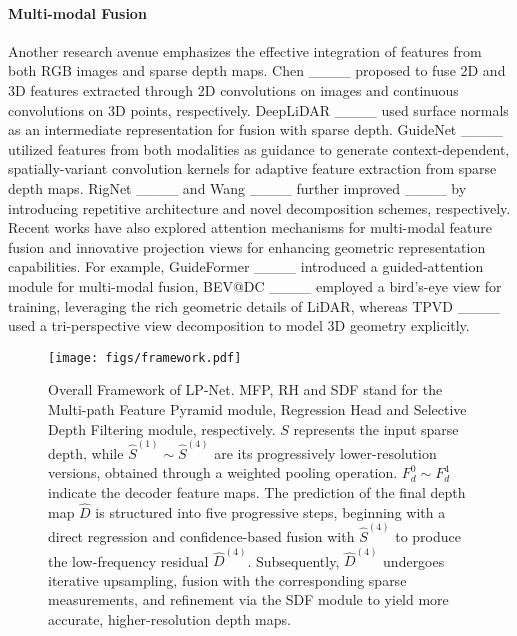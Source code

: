 \paragraph{Multi-modal Fusion}
Another research avenue emphasizes the effective integration of features from both RGB images and sparse depth maps. Chen \etal ____ proposed to fuse 2D and 3D features extracted through 2D convolutions on images and continuous convolutions on 3D points, respectively. DeepLiDAR ____ used surface normals as an intermediate representation for fusion with sparse depth. GuideNet ____ utilized features from both modalities as guidance to generate context-dependent, spatially-variant convolution kernels for adaptive feature extraction from sparse depth maps. RigNet ____ and Wang \etal ____ further improved ____ by introducing repetitive architecture and novel decomposition schemes, respectively. Recent works have also explored attention mechanisms for multi-modal feature fusion and innovative projection views for enhancing geometric representation capabilities. For example, GuideFormer ____ introduced a guided-attention module for multi-modal fusion, BEV@DC ____ employed a bird's-eye view for training, leveraging the rich geometric details of LiDAR, whereas TPVD ____ used a tri-perspective view decomposition to model 3D geometry explicitly.

\begin{figure*}
    \centering
    \texttt{[image: figs/framework.pdf]}
    \caption{Overall Framework of LP-Net. MFP, RH and SDF stand for the Multi-path Feature Pyramid module, Regression Head and Selective Depth Filtering module, respectively. $S$ represents the input sparse depth, while $\hat{S}^{(1)}\sim \hat{S}^{(4)}$ are its progressively lower-resolution versions, obtained through a weighted pooling operation. $F_{d}^{0}\sim F_{d}^{4}$ indicate the decoder feature maps. The prediction of the final depth map $\hat{D}$ is structured into five progressive steps, beginning with a direct regression and confidence-based fusion with $\hat{S}^{(4)}$ to produce the low-frequency residual $\hat{D}^{(4)}$. Subsequently, $\hat{D}^{(4)}$ undergoes iterative upsampling, fusion with the corresponding sparse measurements, and refinement via the SDF module to yield more accurate, higher-resolution depth maps.}
    \label{fig.framework}
\end{figure*} 

